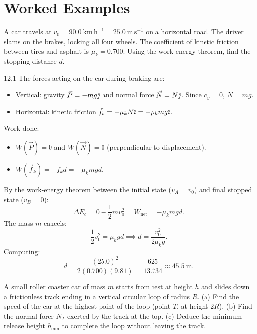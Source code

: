 \section{Worked Examples}

\begin{worked}
A car travels at $v_0 = 90.0\ \mathrm{km\,h^{-1}} = 25.0\ \mathrm{m\,s^{-1}}$ on a horizontal road. The driver slams on the brakes, locking all four wheels. The coefficient of kinetic friction between tires and asphalt is $\mu_k = 0.700$. Using the work-energy theorem, find the stopping distance $d$.
\end{worked}

\begin{solution}{12.1}
The forces acting on the car during braking are:
\begin{itemize}[leftmargin=1.4em,itemsep=2pt]
  \item Vertical: gravity $\vec{P} = -mg\hat{\jmath}$ and normal force $\vec{N} = N\hat{\jmath}$. Since $a_y = 0$, $N = mg$.
  \item Horizontal: kinetic friction $\vec{f}_k = -\mu_k N\hat{\imath} = -\mu_k mg\hat{\imath}$.
\end{itemize}
Work done:
\begin{itemize}[leftmargin=1.4em,itemsep=2pt]
  \item $W(\vec{P}) = 0$ and $W(\vec{N}) = 0$ (perpendicular to displacement).
  \item $W(\vec{f}_k) = -f_k d = -\mu_k mg d$.
\end{itemize}
By the work-energy theorem between the initial state ($v_A = v_0$) and final stopped state ($v_B = 0$):
\[
\Delta E_c = 0 - \frac{1}{2}m v_0^2 = W_{\text{net}} = -\mu_k mg d.
\]
The mass $m$ cancels:
\[
\frac{1}{2}v_0^2 = \mu_k g d \implies \boxed{d = \frac{v_0^2}{2\mu_k g}.}
\]
Computing:
\[
d = \frac{(25.0)^2}{2(0.700)(9.81)} = \frac{625}{13.734} \approx \mathbf{45.5\ \mathrm{m}.}
\]
\end{solution}

\begin{worked}
A small roller coaster car of mass $m$ starts from rest at height $h$ and slides down a frictionless track ending in a vertical circular loop of radius $R$.
(a) Find the speed of the car at the highest point of the loop (point $T$, at height $2R$).
(b) Find the normal force $N_T$ exerted by the track at the top.
(c) Deduce the minimum release height $h_{\min}$ to complete the loop without leaving the track.
\end{worked}

